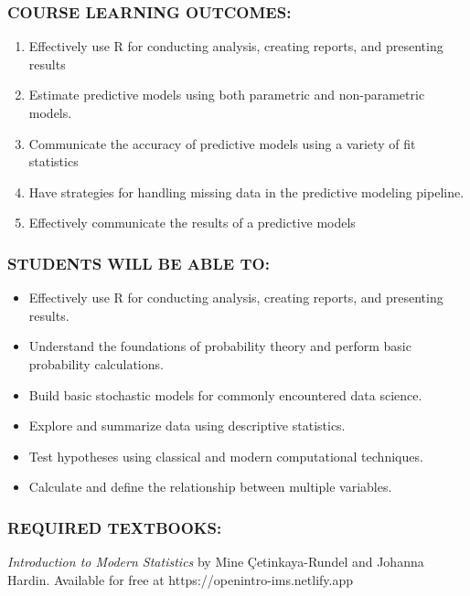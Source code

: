 \documentclass[
  letterpaper,
  DIV=11,
  numbers=noendperiod]{scrartcl}
\providecommand{\tightlist}{%
  \setlength{\itemsep}{0pt}\setlength{\parskip}{0pt}}\usepackage{longtable,booktabs,array}
\begin{document}
\subsubsection{COURSE LEARNING
OUTCOMES:}\label{course-learning-outcomes}

\begin{enumerate}
\def\labelenumi{\arabic{enumi}.}
\tightlist
\item
  Effectively use R for conducting analysis, creating reports, and
  presenting results
\item
  Estimate predictive models using both parametric and non-parametric
  models.
\item
  Communicate the accuracy of predictive models using a variety of fit
  statistics
\item
  Have strategies for handling missing data in the predictive modeling
  pipeline.
\item
  Effectively communicate the results of a predictive models
\end{enumerate}

\subsubsection{STUDENTS WILL BE ABLE
TO:}\label{students-will-be-able-to}

\begin{itemize}
\tightlist
\item
  Effectively use R for conducting analysis, creating reports, and
  presenting results.
\item
  Understand the foundations of probability theory and perform basic
  probability calculations.
\item
  Build basic stochastic models for commonly encountered data science.
\item
  Explore and summarize data using descriptive statistics.
\item
  Test hypotheses using classical and modern computational techniques.
\item
  Calculate and define the relationship between multiple variables.
\end{itemize}

\subsubsection{REQUIRED TEXTBOOKS:}\label{required-textbooks}

\emph{Introduction to Modern Statistics} by Mine Çetinkaya-Rundel and
Johanna Hardin. Available for free at https://openintro-ims.netlify.app
\end{document}
